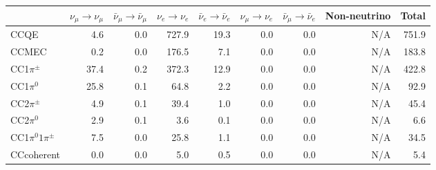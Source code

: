 \newpage
\begin{table}
\begin{adjustbox}{width=1\textwidth}
\begin{tabular} {l r r r r r r r r}
\hline

              & $\nu_{\mu} \rightarrow \nu_{\mu}$ & $\bar{\nu}_{\mu} \rightarrow \bar{\nu}_{\mu}$ & $\nu_{e} \rightarrow \nu_{e}$ & $\bar{\nu}_{e} \rightarrow \bar{\nu}_{e}$ & $\nu_{\mu} \rightarrow \nu_{e}$ & $\bar{\nu}_{\mu} \rightarrow \bar{\nu}_{e}$ & Non-neutrino         & Total                \\ \hline\hline
 CCQE         & 4.6                  & 0.0                  & 727.9                & 19.3                 & 0.0                  & 0.0                  & N/A                  & 751.9                \\ \hline
 CCMEC        & 0.2                  & 0.0                  & 176.5                & 7.1                  & 0.0                  & 0.0                  & N/A                  & 183.8                \\ \hline
 CC1$\pi^{\pm}$ & 37.4                 & 0.2                  & 372.3                & 12.9                 & 0.0                  & 0.0                  & N/A                  & 422.8                \\ \hline
 CC1$\pi^{0}$   & 25.8                 & 0.1                  & 64.8                 & 2.2                  & 0.0                  & 0.0                  & N/A                  & 92.9                 \\ \hline
 CC2$\pi^{\pm}$ & 4.9                  & 0.1                  & 39.4                 & 1.0                  & 0.0                  & 0.0                  & N/A                  & 45.4                 \\ \hline
 CC2$\pi^{0}$   & 2.9                  & 0.1                  & 3.6                  & 0.1                  & 0.0                  & 0.0                  & N/A                  & 6.6                  \\ \hline
 CC1$\pi^{0}1\pi^{\pm}$ & 7.5                  & 0.0                  & 25.8                 & 1.1                  & 0.0                  & 0.0                  & N/A                  & 34.5                 \\ \hline
 CCcoherent   & 0.0                  & 0.0                  & 5.0                  & 0.5                  & 0.0                  & 0.0                  & N/A                  & 5.4                  \\ \hline

\end{tabular}
\end{adjustbox}
\end{table}
